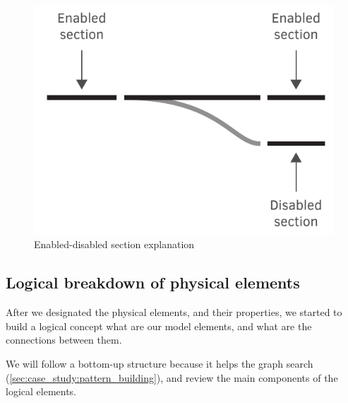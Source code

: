 \begin{figure}[h]
	\centering
	\includegraphics[width=0.5\linewidth]{include/figures/chapter_6/metamodel_switch_endi}
	\caption{Enabled-disabled section explanation}
	\label{fig:case_study:metamodel_switch_endi}
\end{figure}

\subsection{Logical breakdown of physical elements}
After we designated the physical elements, and their properties, we started to build a logical concept what are our model elements, and what are the connections between them.

We will follow a bottom-up structure because it helps the graph search (\cref{sec:case_study:pattern_building}), and review the main components of the logical elements.

